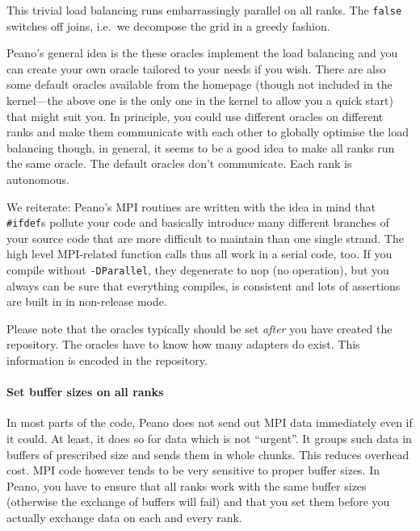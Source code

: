 \noindent
This trivial load balancing runs embarrassingly parallel on all ranks. 
The \texttt{false} switches off joins, i.e.~we decompose the grid in a greedy
fashion.

Peano's general idea is the these oracles implement the load balancing and you
can create your own oracle tailored to your needs if you wish.
There are also some default oracles available from the homepage (though not
included in the kernel---the above one is the only one in the kernel to allow
you a quick start) that might suit you.
In principle, you could use different oracles on different ranks and make them
communicate with each other to globally optimise the load balancing
though, in general, it seems to be a good idea to make all ranks 
run the same oracle.
The default oracles don't communicate. 
Each rank is autonomous.
 
\begin{remark}
We reiterate:
Peano's MPI routines are written with the idea in mind that \texttt{#ifdef}s
pollute your code and basically introduce many different branches of your source
code that are more difficult to maintain than one single strand. The high level
MPI-related function calls thus all work in a serial code, too. If you
compile without \texttt{-DParallel}, they degenerate to nop (no operation), but
you always can be sure that everything compiles, is consistent and lots of
assertions are built in in non-release mode.
\end{remark}

\begin{remark}
Please note that the oracles typically should be set {\em after} you have
created the repository.
The oracles have to know how many adapters do exist.
This information is encoded in the repository.
\end{remark}



\paragraph{Set buffer sizes on all ranks}
In most parts of the code, Peano does not send out MPI data immediately even 
if it could.
At least, it does so for data which is not ``urgent''.
It groups such data in buffers of prescribed size and sends them in whole
chunks.
This reduces overhead cost.
MPI code however tends to be very sensitive to proper buffer
sizes.
In Peano, you have to ensure that all ranks work with the same buffer sizes
(otherwise the exchange of buffers will fail) and that you set them before you
actually exchange data on each and every rank. 

